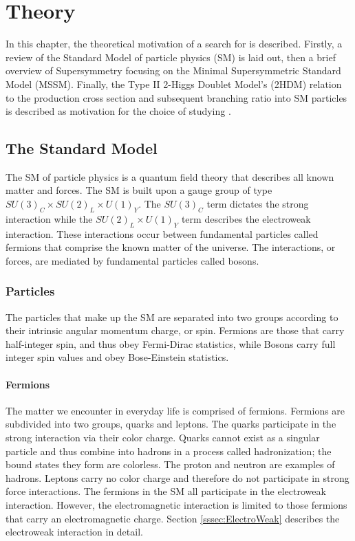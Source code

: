 \chapter{Theory}\label{chap:Theory}
    In this chapter, the theoretical motivation of a search for \HpmLong is described. Firstly, a review of the Standard Model of particle physics (SM) is laid out, then a brief overview of Supersymmetry focusing on the Minimal Supersymmetric Standard Model (MSSM). Finally, the Type II 2-Higgs Doublet Model's (2HDM) relation to the \Hpm production cross section and subsequent branching ratio into SM particles is described as motivation for the choice of studying \HpmLong.

\section{The Standard Model}\label{sec:SM}
	 The SM of particle physics is a quantum field theory that describes all known matter and forces. The SM is built upon a gauge group of type $SU(3)_C \times SU(2)_L \times U(1)_Y$. The $SU(3)_C$ term dictates the strong interaction while the $SU(2)_L \times U(1)_Y$ term describes the electroweak interaction. These interactions occur between fundamental particles called fermions that comprise the known matter of the universe. The interactions, or forces, are mediated by fundamental particles called bosons. 

	\subsection{Particles}\label{ssec:Particles}
		The particles that make up the SM are separated into two groups according to their intrinsic angular momentum charge, or spin. Fermions are those that carry half-integer spin, and thus obey Fermi-Dirac statistics, while Bosons carry full integer spin values and obey Bose-Einstein statistics.
		
		\subsubsection{Fermions}\label{sssec:Fermions}
			The matter we encounter in everyday life is comprised of fermions. Fermions are subdivided into two groups, quarks and leptons. The quarks participate in the strong interaction via their color charge. Quarks cannot exist as a singular particle and thus combine into hadrons in a process called hadronization; the bound states they form are colorless. The proton and neutron are examples of hadrons. Leptons carry no color charge and therefore do not participate in strong force interactions. The fermions in the SM all participate in the electroweak interaction. However, the electromagnetic interaction is limited to those fermions that carry an electromagnetic charge. Section \ref{sssec:ElectroWeak} describes the electroweak interaction in detail.

